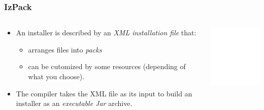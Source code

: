 \documentclass[compress,10pt]{beamer}
\begin{document}
\begin{frame}

\frametitle{IzPack}

\begin{columns}

  \begin{column}{6.5cm}
  \begin{itemize}

    \item An installer is described by an \textsl{XML installation file} that:
      \begin{itemize}
        \item arranges files into \textsl{packs}
        \item can be cutomized by some resources (depending of what you choose).
      \end{itemize}

    \item The compiler takes the XML file as its input to build an installer as
    an \textsl{executable Jar} archive.

  \end{itemize}
  \end{column}

  \begin{column}{4cm}
  \includegraphics[width=4cm,angle=270]{izpack-overview}
  \end{column}

\end{columns}

\end{frame}

\end{document}
